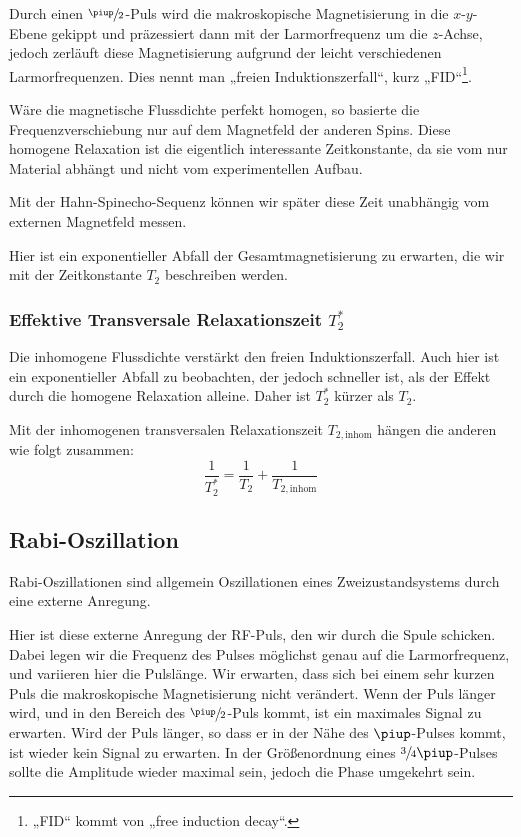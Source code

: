 Durch einen $\sfrac\piup2$-Puls wird die makroskopische Magnetisierung in die
$x$-$y$-Ebene gekippt und präzessiert dann mit der Larmorfrequenz um die
$z$-Achse, jedoch zerläuft diese Magnetisierung aufgrund der leicht
verschiedenen Larmorfrequenzen. Dies nennt man „freien Induktionszerfall“, kurz
„FID“\footnote{„FID“ kommt von „free induction decay“.}.

Wäre die magnetische Flussdichte perfekt homogen, so basierte die
Frequenzverschiebung nur auf dem Magnetfeld der anderen Spins. Diese homogene
Relaxation ist die eigentlich interessante Zeitkonstante, da sie vom nur
Material abhängt und nicht vom experimentellen Aufbau.

Mit der Hahn-Spinecho-Sequenz können wir später diese Zeit unabhängig vom
externen Magnetfeld messen.

Hier ist ein exponentieller Abfall der Gesamtmagnetisierung zu erwarten, die
wir mit der Zeitkonstante $T_2$ beschreiben werden.

\subsubsection{Effektive Transversale Relaxationszeit $T_2^*$}

Die inhomogene Flussdichte verstärkt den freien Induktionszerfall. Auch hier
ist ein exponentieller Abfall zu beobachten, der jedoch schneller ist, als der
Effekt durch die homogene Relaxation alleine. Daher ist $T_2^*$ kürzer als
$T_2$.

Mit der inhomogenen transversalen Relaxationszeit $T_{2,\text{inhom}}$ hängen
die anderen wie folgt zusammen: \parencite[Formel~P443.5]{physik412-Anleitung}
\begin{equation}
    \label{eq:}
    \frac{1}{T_2^*} = \frac 1{T_2} + \frac{1}{T_{2,\text{inhom}}}
\end{equation}

\subsection{Rabi-Oszillation}

Rabi-Oszillationen sind allgemein Oszillationen eines Zweizustandsystems durch
eine externe Anregung. \cite{wikipedia/Rabi_Oszillation} \cite[Abschnitt~15.9.5
„Rabi-Atomstrahlresonanz”]{meschede-gerthsen_24}

Hier ist diese externe Anregung der RF-Puls, den wir durch die Spule schicken.
Dabei legen wir die Frequenz des Pulses möglichst genau auf die Larmorfrequenz,
und variieren hier die Pulslänge. Wir erwarten, dass sich bei einem sehr kurzen
Puls die makroskopische Magnetisierung nicht verändert. Wenn der Puls länger
wird, und in den Bereich des $\sfrac\piup2$-Puls kommt, ist ein maximales
Signal zu erwarten. Wird der Puls länger, so dass er in der Nähe des
$\piup$-Pulses kommt, ist wieder kein Signal zu erwarten. In der Größenordnung
eines $\sfrac34\piup$-Pulses sollte die Amplitude wieder maximal sein, jedoch
die Phase umgekehrt sein.

